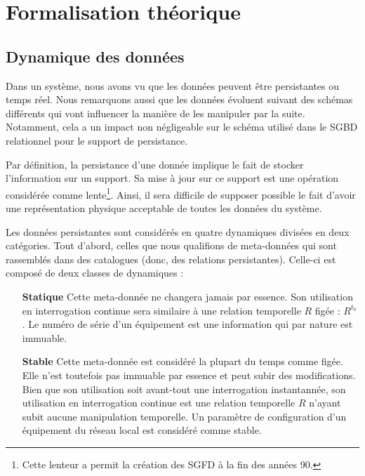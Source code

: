 \section{Formalisation théorique}\label{sec:contrib:asteroid:theorie}

\subsection{Dynamique des données}
Dans un système, nous avons vu que les données peuvent être persistantes ou temps réel. Nous remarquons aussi que les données évoluent suivant des schémas différents qui vont influencer la manière de les manipuler par la suite. Notamment, cela a un impact non négligeable sur le schéma utilisé dans le SGBD relationnel pour le support de persistance.

Par définition, la persistance d'une donnée implique le fait de stocker l'information sur un support. Sa mise à jour sur ce support est une opération considérée comme lente\footnote{Cette lenteur a permit la création des SGFD à la fin des années 90.}. Ainsi, il sera difficile de supposer possible le fait d'avoir une représentation physique acceptable de toutes les données du système.

Les données persistantes sont considérés en quatre dynamiques divisées en deux catégories. Tout d'abord, celles que nous qualifions de meta-données qui sont rassemblés dans des catalogues (donc, des relations persistantes). Celle-ci est composé de deux classes de dynamiques :
\begin{itemize}
	\item[\textbf{Statique}] Cette meta-donnée ne changera jamais par essence. Son utilisation en interrogation continue sera similaire à une relation temporelle $R$ figée : $R^{t_0}$. Le numéro de série d'un équipement est une information qui par nature est immuable.
	\item[\textbf{Stable}] Cette meta-donnée est considéré la plupart du temps comme figée. Elle n'est toutefois pas immuable par essence et peut subir des modifications. Bien que son utilisation soit avant-tout une interrogation instantannée, son utilisation en interrogation continue est une relation temporelle $R$ n'ayant subit aucune manipulation temporelle. Un paramètre de configuration d'un équipement du réseau local est considéré comme stable.
\end{itemize}

